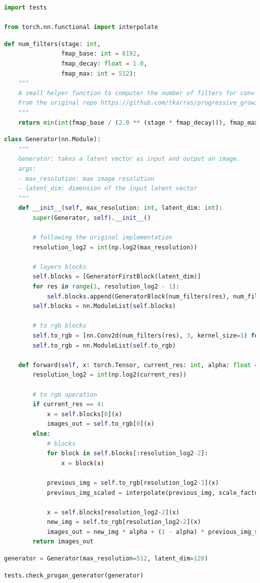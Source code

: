 \begin{lstlisting}[language=Python]
import tests

from torch.nn.functional import interpolate
\end{lstlisting}

\begin{lstlisting}[language=Python]
def num_filters(stage: int, 
                fmap_base: int = 8192,
                fmap_decay: float = 1.0,
                fmap_max: int = 512): 
    """
    A small helper function to computer the number of filters for conv layers based on the depth.
    From the original repo https://github.com/tkarras/progressive_growing_of_gans/blob/master/networks.py#L252
    """
    return min(int(fmap_base / (2.0 ** (stage * fmap_decay))), fmap_max)
\end{lstlisting}

\begin{lstlisting}[language=Python]
class Generator(nn.Module):
    """
    Generator: takes a latent vector as input and output an image.
    args:
    - max_resolution: max image resolution
    - latent_dim: dimension of the input latent vector
    """
    def __init__(self, max_resolution: int, latent_dim: int):
        super(Generator, self).__init__()

        # following the original implementation
        resolution_log2 = int(np.log2(max_resolution))

        # layers blocks
        self.blocks = [GeneratorFirstBlock(latent_dim)]
        for res in range(1, resolution_log2 - 1):
            self.blocks.append(GeneratorBlock(num_filters(res), num_filters(res+1)))
        self.blocks = nn.ModuleList(self.blocks)

        # to rgb blocks
        self.to_rgb = [nn.Conv2d(num_filters(res), 3, kernel_size=1) for res in range(1, resolution_log2)]
        self.to_rgb = nn.ModuleList(self.to_rgb)

    def forward(self, x: torch.Tensor, current_res: int, alpha: float = 1.0):
        resolution_log2 = int(np.log2(current_res))

        # to rgb operation
        if current_res == 4:
            x = self.blocks[0](x)
            images_out = self.to_rgb[0](x)
        else:
            # blocks
            for block in self.blocks[:resolution_log2-2]:
                x = block(x)

            previous_img = self.to_rgb[resolution_log2-3](x)
            previous_img_scaled = interpolate(previous_img, scale_factor=2)

            x = self.blocks[resolution_log2-2](x)
            new_img = self.to_rgb[resolution_log2-2](x)
            images_out = new_img * alpha + (1 - alpha) * previous_img_scaled
        return images_out
\end{lstlisting}

\begin{lstlisting}[language=Python]
generator = Generator(max_resolution=512, latent_dim=128)
\end{lstlisting}

\begin{lstlisting}[language=Python]
tests.check_progan_generator(generator)
\end{lstlisting}

\begin{lstlisting}[language=Python]
\end{lstlisting}
